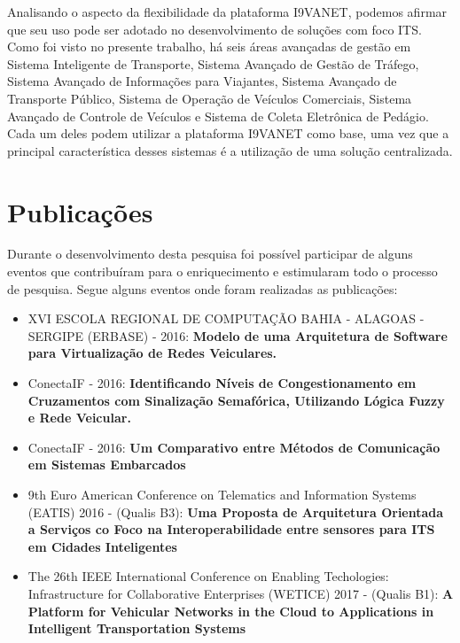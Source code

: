 \documentclass[
	12pt,				%
	oneside,			%
	a4paper,			%
	english,			%
	brazil				%
	]{abntex2ppgsi}
\begin{document}
Analisando o aspecto da flexibilidade da plataforma I9VANET, podemos afirmar que seu uso pode ser adotado no desenvolvimento de soluções com foco ITS. Como foi visto no presente trabalho, há seis áreas avançadas de gestão em Sistema Inteligente de Transporte, Sistema Avançado de Gestão de Tráfego, Sistema Avançado de Informações para Viajantes, Sistema Avançado de Transporte Público, Sistema de Operação de Veículos Comerciais, Sistema Avançado de Controle de Veículos e Sistema de Coleta Eletrônica de Pedágio. Cada um deles podem utilizar a plataforma I9VANET como base, uma vez que a principal característica desses sistemas é a utilização de uma solução centralizada. 

\section{Publicações}

Durante o desenvolvimento desta pesquisa foi possível participar de alguns eventos que contribuíram para o enriquecimento e estimularam todo o processo de pesquisa. Segue alguns eventos onde foram realizadas as publicações: 

\begin{itemize}

	\item {XVI ESCOLA REGIONAL DE COMPUTAÇÃO BAHIA - ALAGOAS - SERGIPE  (ERBASE) - 2016: \textbf{Modelo de uma Arquitetura de Software para Virtualização de Redes Veiculares.}}
	
	\item {ConectaIF - 2016: \textbf{Identificando Níveis de Congestionamento em Cruzamentos com Sinalização Semafórica, Utilizando Lógica Fuzzy e Rede Veicular.}}
	
	\item {ConectaIF - 2016: \textbf{Um Comparativo entre Métodos de Comunicação em Sistemas Embarcados}}
	
	\item{9th Euro American Conference on Telematics and Information Systems (EATIS) 2016 - (Qualis B3): \textbf{Uma Proposta de Arquitetura Orientada a Serviços co Foco na Interoperabilidade entre sensores para ITS em Cidades Inteligentes} }
	
	\item{The 26th IEEE International Conference on Enabling Techologies: Infrastructure for Collaborative Enterprises (WETICE) 2017 - (Qualis B1): \textbf{A Platform for Vehicular Networks in the Cloud to Applications in Intelligent Transportation Systems} }

\end{itemize}
\end{document}
